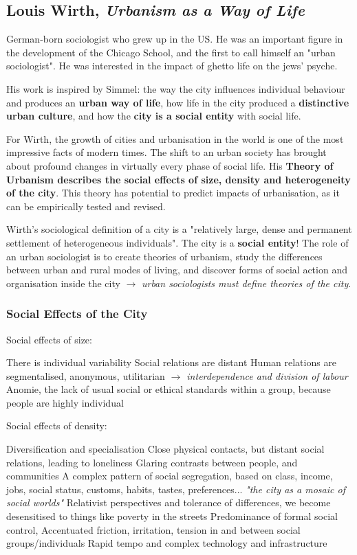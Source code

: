 \documentclass{article}
\begin{document}
\subsection{Louis Wirth, \textit{Urbanism as a Way of Life}}

German-born sociologist who grew up in the US. He was an important figure in the development of the Chicago School, and the first to call himself an "urban sociologist". He was interested in the impact of ghetto life on the jews' psyche. 

His work is inspired by Simmel: the way the city influences individual behaviour and produces an \textbf{urban way of life}, how life in the city produced a \textbf{distinctive urban culture}, and how the \textbf{city is a social entity} with social life.

For Wirth, the growth of cities and urbanisation in the world is one of the most impressive facts of modern times. The shift  to an urban society has brought about profound changes in virtually every phase of social life. 
His \textbf{Theory of Urbanism describes the social effects of size, density and heterogeneity of the city}. This theory has potential to predict impacts of urbanisation, as it can be empirically tested and revised.

Wirth's sociological definition of a city is a "relatively large, dense and permanent settlement of heterogeneous individuals". The city is a \textbf{social entity}! The role of an urban sociologist is to create theories of urbanism, study the differences between urban and rural modes of living, and discover forms of social action and organisation inside the city $\rightarrow$ \textit{urban sociologists must define theories of the city}.

\subsubsection{Social Effects of the City}

Social effects of size:
\begin{outline}
	\1 There is individual variability
	\1 Social relations are distant
	\1 Human relations are segmentalised, anonymous, utilitarian \textit{$\rightarrow$ interdependence and division of labour}
	\1 Anomie, the lack of usual social or ethical standards within a group, because people are highly individual
\end{outline}

Social effects of density:
\begin{outline}
	\1 Diversification and specialisation
	\1 Close physical contacts, but distant social relations, leading to loneliness
	\1 Glaring contrasts between people, and communities
	\1 A complex pattern of social segregation, based on class, income, jobs, social status, customs, habits, tastes, preferences... \textit{"the city as a mosaic of social worlds"}
	\1 Relativist perspectives and tolerance of differences, we become desensitised to things like poverty in the streets
	\1 Predominance of formal social control, 
	\1 Accentuated friction, irritation, tension in and between social groups/individuals
	\1 Rapid tempo and complex technology and infrastructure
\end{outline}
\end{document}
